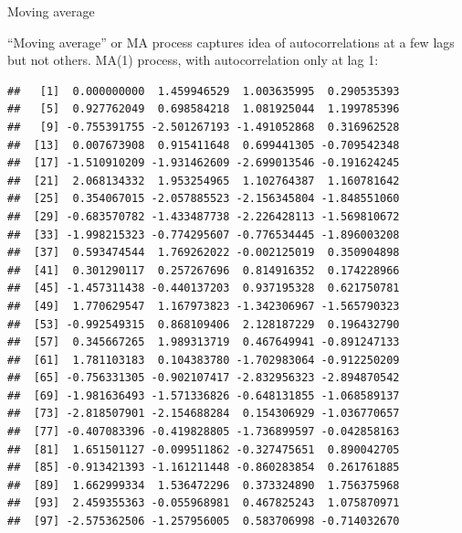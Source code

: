 \begin{frame}[fragile]{Moving average}
  
``Moving average'' or MA process captures idea of autocorrelations at
a few lags but not others. MA(1) process, with autocorrelation only at lag 1:

{\footnotesize
\begin{knitrout}
\color{fgcolor}\begin{kframe}
\begin{alltt}
\hlkwb{=}\hlstd{(}\hlstd{)}
\hlkwb{=}\hlstd{(}\hlstd{)}
\hlstd{y[}\hlstd{]}\hlkwb{=}
\hlkwb{=}
   \hlopt{:}\hlstd{)}
\hlstd{\{}
  \hlkwb{=}\hlopt{+}\hlopt{*}\hlstd{e[i}\hlopt{-}\hlstd{]}
\hlstd{\}}
\end{alltt}
\begin{verbatim}
##   [1]  0.000000000  1.459946529  1.003635995  0.290535393
##   [5]  0.927762049  0.698584218  1.081925044  1.199785396
##   [9] -0.755391755 -2.501267193 -1.491052868  0.316962528
##  [13]  0.007673908  0.915411648  0.699441305 -0.709542348
##  [17] -1.510910209 -1.931462609 -2.699013546 -0.191624245
##  [21]  2.068134332  1.953254965  1.102764387  1.160781642
##  [25]  0.354067015 -2.057885523 -2.156345804 -1.848551060
##  [29] -0.683570782 -1.433487738 -2.226428113 -1.569810672
##  [33] -1.998215323 -0.774295607 -0.776534445 -1.896003208
##  [37]  0.593474544  1.769262022 -0.002125019  0.350904898
##  [41]  0.301290117  0.257267696  0.814916352  0.174228966
##  [45] -1.457311438 -0.440137203  0.937195328  0.621750781
##  [49]  1.770629547  1.167973823 -1.342306967 -1.565790323
##  [53] -0.992549315  0.868109406  2.128187229  0.196432790
##  [57]  0.345667265  1.989313719  0.467649941 -0.891247133
##  [61]  1.781103183  0.104383780 -1.702983064 -0.912250209
##  [65] -0.756331305 -0.902107417 -2.832956323 -2.894870542
##  [69] -1.981636493 -1.571336826 -0.648131855 -1.068589137
##  [73] -2.818507901 -2.154688284  0.154306929 -1.036770657
##  [77] -0.407083396 -0.419828805 -1.736899597 -0.042858163
##  [81]  1.651501127 -0.099511862 -0.327475651  0.890042705
##  [85] -0.913421393 -1.161211448 -0.860283854  0.261761885
##  [89]  1.662999334  1.536472296  0.373324890  1.756375968
##  [93]  2.459355363 -0.055968981  0.467825243  1.075870971
##  [97] -2.575362506 -1.257956005  0.583706998 -0.714032670
\end{verbatim}
\end{kframe}
\end{knitrout}
}
  
\end{frame}

